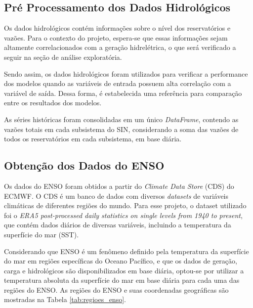 \subsection{Pré Processamento dos Dados Hidrológicos} %
Os dados hidrológicos contém informações sobre o nível dos reservatórios e vazões. Para o contexto do projeto, espera-se que
essas informações sejam altamente correlacionados com a geração hidrelétrica, o que será verificado a seguir na seção de análise 
exploratória.

Sendo assim, os dados hidrológicos foram utilizados para verificar a performance dos modelos quando as variáveis de entrada
possuem alta correlação com a variável de saída. Dessa forma, é estabelecida uma referência para comparação entre os
resultados dos modelos.

As séries históricas foram consolidadas em um único \textit{DataFrame}, contendo as vazões totais em cada subsistema do SIN,
considerando a soma das vazões de todos os reservatórios em cada subsistema, em base diária.

\subsection{Obtenção dos Dados do ENSO} %
Os dados do ENSO foram obtidos a partir do \textit{Climate Data Store} (CDS) do ECMWF. O CDS é um banco de dados com diversos
\textit{datasets} de variáveis climáticas de diferentes regiões do mundo. Para esse projeto, o dataset utilizado foi o 
\textit{ERA5 post-processed daily statistics on single levels from 1940 to present}, que contém dados diários de diversas 
variáveis, incluindo a temperatura da superfície do mar (SST).

Considerando que ENSO é um fenômeno definido pela temperatura da superfície do mar em regiões 
específicas do Oceano Pacífico, e que os dados de geração, carga e hidrológicos são disponibilizados em base diária,
optou-se por utilizar a temperatura absoluta da superfície do mar em base diária para cada uma das regiões do ENSO. As
regiões do ENSO e suas coordenadas geográficas são mostradas na Tabela \ref{tab:regioes_enso}.

\begin{table}[htb]
  \centering
\end{table}

